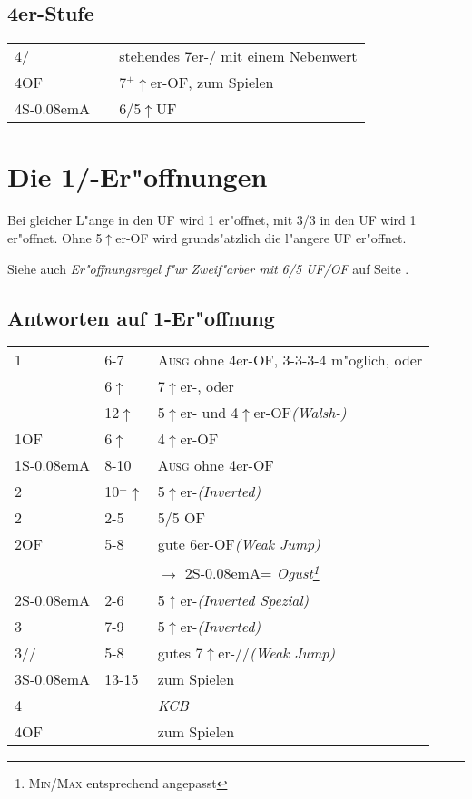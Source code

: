 \documentclass[11pt,german,twocolumn,twoside]{scrartcl}
\def\pi{\Sp\xspace}
\def\co{\He\xspace}
\def\ka{\Di\xspace}
\def\tr{\Cl\xspace}
\def\sa{\nobreak\textsf{S\kern-0.08emA}\xspace}
\def\ofa{\nobreak\textsf{OF}\xspace}
\def\ufa{\nobreak\textsf{UF}\xspace}
\def\kar{\nobreak\hspace{\cardskip}\Di\xspace}
\def\tre{\nobreak\hspace{\cardskip}\Cl\xspace}
\def\SA{\nobreak\hspace{\cardskip}\sa}
\def\of{\nobreak\hspace{\cardskip}\textsf{OF}\xspace}
\def\uf{\nobreak\hspace{\cardskip}\textsf{UF}\xspace}
\def\mi{\hspace{\cardskip}\Cl{}/\Di\xspace}
\def\ma{\hspace{\cardskip}\He{}/\Sp\xspace}
\def\good{$^+$\xspace}
\def\ra{$\rightarrow$\xspace}
\def\pl{$\uparrow$\xspace}
\newcommand{\conv}[1]{\emph{#1}}
\def\bal{\textsc{Ausg}\xspace}
\def\maxi{\textsc{Max}\xspace}
\def\mini{\textsc{Min}\xspace}
\newcommand\bidins[1]%
{%
\begin{flushleft}
\begin{tabularx}{\columnwidth}{llY}%
#1
\end{tabularx}%
\end{flushleft}
}
\newcommand\bidinsfixed[1]{%
\begin{tabularx}{\columnwidth}{p{3em}p{2.5em}Y}%
#1
\end{tabularx}%
}
\newcommand{\Index}[1]{#1\index{#1}}
\begin{document}
\subsection*{4er-Stufe}
\bidinsfixed{%
4\mi	& 	& stehendes 7er-\ma mit einem Nebenwert\\[1ex]
4\of	&	& 7\good{}\pl{}er-\ofa, zum Spielen\\[1ex]
4\SA	&	& 6/5\pl\uf
}

%
%
\newpage
\section{Die 1\tre/\ka-Er"offnungen}

Bei gleicher L"ange in den \uf wird 1\kar er"offnet, mit 3/3 in den \uf
wird 1\tre er"offnet.
Ohne 5\pl{}er-\ofa wird grunds"atzlich die l"angere \uf er"offnet.

Siehe auch \textit{Er"offnungsregel f"ur Zweif"arber mit 6/5 \ufa/\ofa{}} auf
Seite \pageref{zfregel}.

\subsection{Antworten auf 1\tre-Er"offnung} \label{1treff}
\bidins{%
1\kar	& 6-7	& \bal ohne 4er-\ofa, 3-3-3-4 m"oglich, oder\\
	& 6\pl	& 7\pl{}er-\ka, oder\\
	& 12\pl	& 5\pl{}er-\ka und 4\pl{}er-\ofa \conv{(Walsh-\ka)}\\[1ex]
1\of	& 6\pl	& 4\pl{}er-\ofa\\[1ex]
1\SA	& 8-10	& \bal ohne 4er-\ofa\\[1ex]
2\tre	& 10\good{}\pl & 5\pl{}er-\tr \conv{(Inverted)}\\[1ex]
2\kar	& 2-5	& 5/5 \ofa\\[1ex]
2\of	& 5-8	& gute 6er-\ofa \conv{(Weak Jump)}\\
        &       & \ra 2\SA = \conv{\Index{Ogust}\footnote{\mini/\maxi entsprechend angepasst}} \\[1ex]
2\SA    & 2-6   & 5\pl{}er-\tr \conv{(Inverted Spezial)}\\
3\tre	& 7-9	& 5\pl{}er-\tr \conv{(Inverted)}\\[1ex]
3\kar/\co/\pi & 5-8 & gutes 7\pl{}er-\ka/\co/\pi \conv{(Weak Jump)}\\[1ex]
3\SA	& 13-15	& zum Spielen\\[1ex]
4\tre	&	& \conv{KCB}\\[1ex]
4\of	&	& zum Spielen
}
\end{document}
